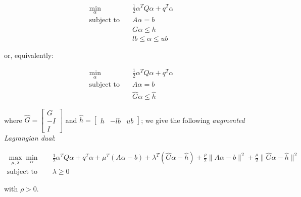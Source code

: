 \begin{equation}
    \begin{aligned} 
        \min_{\alpha} \quad & \frac{1}{2} \alpha^T Q \alpha + q^T \alpha \\
            \textrm{subject to} \quad & A \alpha = b \\ & G \alpha \leq h \\ & lb \leq \alpha \leq ub
    \end{aligned}
\end{equation}

or, equivalently:

\begin{equation}
    \begin{aligned}
        \min_{\alpha} \quad & \frac{1}{2} \alpha^T Q \alpha + q^T \alpha \\
            \textrm{subject to} \quad & A \alpha = b \\ & \hat{G} \alpha \leq \hat{h}
    \end{aligned}
\end{equation}

where $\hat{G} =
\begin{bmatrix}
 G \\
-I \\
 I 
\end{bmatrix}$ and $\hat{h} =
\begin{bmatrix}
h & -lb & ub
\end{bmatrix}$; we give the following \emph{augmented Lagrangian dual}:

\begin{equation} \label{eq:aug_lagrangian_dual}
	\begin{aligned}
		    \max_{\mu,\lambda} \min_{\alpha} \quad & \frac{1}{2} \alpha^T Q \alpha + q^T \alpha + \mu^T (A \alpha - b) + \lambda^T (\hat{G} \alpha - \hat{h}) + \frac{\rho}{2} \| A \alpha - b \|^2 + \frac{\rho}{2} \| \hat{G} \alpha - \hat{h} \|^2 \\
    \text{subject to} \quad & \lambda \geq 0
	\end{aligned}
\end{equation}

with $\rho > 0$. 